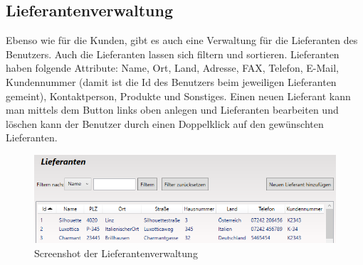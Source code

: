\subsection{Lieferantenverwaltung}
Ebenso wie für die Kunden, gibt es auch eine Verwaltung für die Lieferanten des Benutzers. Auch die Lieferanten lassen sich filtern und sortieren. Lieferanten haben folgende Attribute: Name, Ort, Land, Adresse, FAX, Telefon, E-Mail, Kundennummer (damit ist die Id des Benutzers beim jeweiligen Lieferanten gemeint), Kontaktperson, Produkte und Sonstiges. Einen neuen Lieferant kann man mittels dem Button links oben anlegen und Lieferanten bearbeiten und löschen kann der Benutzer durch einen Doppelklick auf den gewünschten Lieferanten.
\begin{figure}[H]
\begin{center}
	\includegraphics[scale=.45]{images/Lieferanten.png}
\end{center}
	\caption{Screenshot der Lieferantenverwaltung}
	\label{fig:sample}
\end{figure}
